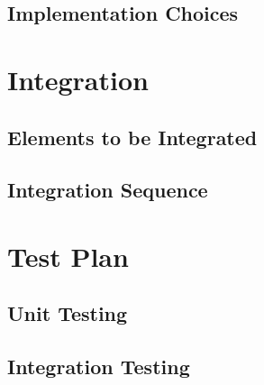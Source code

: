 \documentclass[../DD.tex]{subfiles}
\begin{document}
\subsection{Implementation Choices\label{5.2.2}}



\section{Integration\label{5.3}}

\subsection{Elements to be Integrated\label{5.3.1}}


\subsection{Integration Sequence\label{5.3.2}}



\section{Test Plan\label{5.4}}

\subsection{Unit Testing\label{5.4.1}}


\subsection{Integration Testing\label{5.4.2}}

\end{document}
